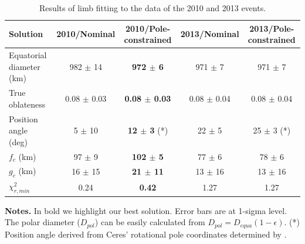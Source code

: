\documentclass[useAMS,usenatbib]{mn2e}
\begin{document}
\begin{table}
 \centering
 \begin{minipage}{140mm}
  \caption{Results of limb fitting to the data of the 2010 and 2013 events.\label{Tab: results}}
  \begin{tabular}{@{}lcccc}
  \hline
     Solution & 2010/Nominal & \textbf{2010/Pole-constrained} & 2013/Nominal & 2013/Pole-constrained \\
\hline
Equatorial diameter (km) & 982 $\pm$ 14 & \textbf{972 $\pm$ 6}  & 971 $\pm$ 7  & 971 $\pm$ 7\\
True oblateness        & 0.08 $\pm$ 0.03 & \textbf{0.08 $\pm$ 0.03} & 0.08 $\pm$ 0.04 & 0.08 $\pm$ 0.04\\
Position angle (deg)   & 5 $\pm$ 10    & \textbf{12 $\pm$ 3} (*)& 22 $\pm$ 5    & 25 $\pm$ 3 (*)\\
$f_c$ (km)             & 97 $\pm$ 9   & \textbf{102 $\pm$ 5}   & 77 $\pm$ 6    & 78 $\pm$ 6\\
$g_c$ (km)             & 16 $\pm$ 15  & \textbf{21 $\pm$ 11}  & 13 $\pm$ 16   & 13 $\pm$ 16\\
$\chi^2_{r,min}$       & 0.24          &  \textbf{0.42}         & 1.27          & 1.27\\
\hline
\end{tabular}
\textbf{Notes.} In bold we highlight our best solution. Error bars are at 1-sigma level. The polar diameter ($D_{pol}$) can be easily calculated from $D_{pol}=D_{equa}(1 - \epsilon)$.
(*) Position angle derived from Ceres' rotational pole coordinates determined by \cite{Drummond2014}.
\end{minipage}
\end{table}
\end{document}
